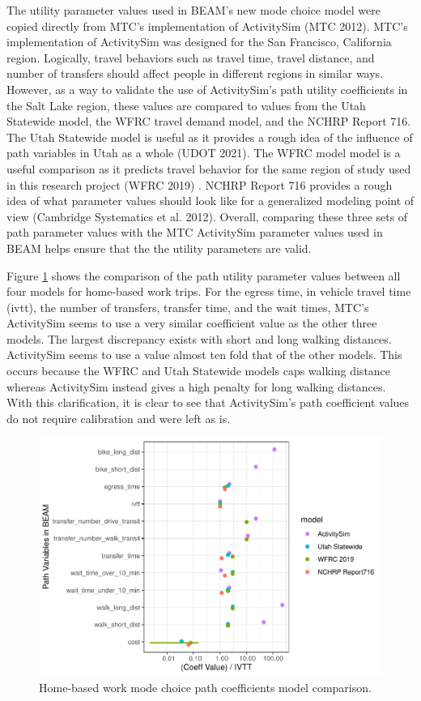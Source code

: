 \documentclass[12pt, oneside, openright]{byuthesis}
\begin{document}
The utility parameter values used in BEAM's new mode choice model were copied directly from MTC's implementation of ActivitySim (MTC 2012). MTC's implementation of ActivitySim was designed for the San Francisco, California region. Logically, travel behaviors such as travel time, travel distance, and number of transfers should affect people in different regions in similar ways. However, as a way to validate the use of ActivitySim's path utility coefficients in the Salt Lake region, these values are compared to values from the Utah Statewide model, the WFRC travel demand model, and the NCHRP Report 716. The Utah Statewide model is useful as it provides a rough idea of the influence of path variables in Utah as a whole (UDOT 2021). The WFRC model model is a useful comparison as it predicts travel behavior for the same region of study used in this research project (WFRC 2019) . NCHRP Report 716 provides a rough idea of what parameter values should look like for a generalized modeling point of view (Cambridge Systematics et al. 2012). Overall, comparing these three sets of path parameter values with the MTC ActivitySim parameter values used in BEAM helps ensure that the the utility parameters are valid.

Figure \ref{fig:hbw} shows the comparison of the path utility parameter values between all four models for home-based work trips. For the egress time, in vehicle travel time (ivtt), the number of transfers, transfer time, and the wait times, MTC's ActivitySim seems to use a very similar coefficient value as the other three models. The largest discrepancy exists with short and long walking distances. ActivitySim seems to use a value almost ten fold that of the other models. This occurs because the WFRC and Utah Statewide models caps walking distance whereas ActivitySim instead gives a high penalty for long walking distances. With this clarification, it is clear to see that ActivitySim's path coefficient values do not require calibration and were left as is.

\begin{figure}

{\centering \includegraphics{thesis_files/figure-latex/hbw-1} 

}

\caption{Home-based work mode choice path coefficients model comparison.}\label{fig:hbw}
\end{figure}
\end{document}
